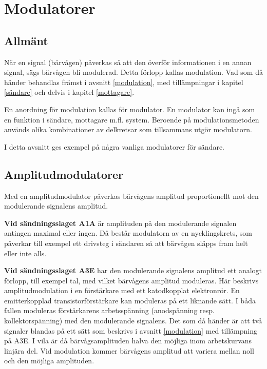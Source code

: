 \section{Modulatorer}

\subsection{Allmänt}

När en signal (bärvågen) påverkas så att den överför informationen i
en annan signal, sägs bärvågen bli modulerad.
Detta förlopp kallas modulation.
Vad som då händer behandlas främst i avsnitt \ref{modulation}, med
tillämpningar i kapitel \ref{sändare} och delvis i kapitel \ref{mottagare}.

En anordning för modulation kallas för modulator.
En modulator kan ingå som en funktion i sändare, mottagare m.fl. system.
Beroende på modulationsmetoden används olika kombinationer av delkretsar som
tillsammans utgör modulatorn.

I detta avsnitt ges exempel på några vanliga modulatorer för sändare.

\subsection{Amplitudmodulatorer}

Med en amplitudmodulator påverkas bärvågens amplitud proportionellt
mot den modulerande signalens amplitud.

\textbf{Vid sändningsslaget A1A} är amplituden på den modulerande signalen
antingen maximal eller ingen.
Då består modulatorn av en nycklingskrets, som påverkar till exempel ett drivsteg i
sändaren så att bärvågen släpps fram helt eller inte alls.

\textbf{Vid sändningsslaget A3E} har den modulerande signalens amplitud
ett analogt förlopp, till exempel tal, med vilket bärvågens amplitud moduleras.
Här beskrivs amplitudmodulation i en förstärkare med ett katodkopplat
elektronrör.
En emitterkopplad transistorförstärkare kan moduleras på ett liknande sätt.
I båda fallen moduleras förstärkarens arbetsspänning (anodspänning resp.
kollektorspänning) med den modulerande signalens.
Det som då händer är att två signaler blandas på ett sätt som beskrivs i
avsnitt \ref{modulation} med tillämpning på A3E.
I vila är då bärvågsamplituden halva den möjliga inom arbetskurvans linjära del.
Vid modulation kommer bärvågens amplitud att variera mellan noll
och den möjliga amplituden.

